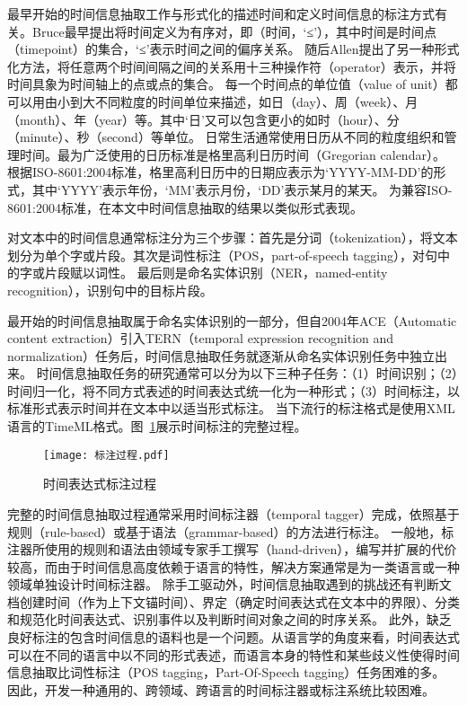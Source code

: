 最早开始的时间信息抽取工作与形式化的描述时间和定义时间信息的标注方式有关。Bruce\cite{bruce1972model}最早提出将时间定义为有序对，即（时间，‘≤’），其中时间是时间点（timepoint）的集合，‘≤’表示时间之间的偏序关系。
随后Allen\cite{allen1983maintaining}提出了另一种形式化方法，将任意两个时间间隔之间的关系用十三种操作符（operator）表示，并将时间具象为时间轴上的点或点的集合。
每一个时间点的单位值（value of unit）都可以用由小到大不同粒度的时间单位来描述，如日（day）、周（week）、月（month）、年（year）等。其中‘日’又可以包含更小的如时（hour）、分（minute）、秒（second）等单位。
日常生活通常使用日历从不同的粒度组织和管理时间。最为广泛使用的日历标准是格里高利日历时间（Gregorian calendar）。
根据ISO-8601:2004标准，格里高利日历中的日期应表示为‘YYYY-MM-DD’的形式，其中‘YYYY’表示年份，‘MM’表示月份，‘DD’表示某月的某天。
为兼容ISO-8601:2004标准，在本文中时间信息抽取的结果以类似形式表现。

对文本中的时间信息通常标注分为三个步骤：首先是分词（tokenization），将文本划分为单个字或片段。其次是词性标注（POS，part-of-speech tagging），对句中的字或片段赋以词性。
最后则是命名实体识别（NER，named-entity recognition），识别句中的目标片段。

最开始的时间信息抽取属于命名实体识别的一部分，但自2004年ACE\cite{doddington2004automatic}（Automatic content extraction）引入TERN（temporal expression recognition and normalization）任务后，时间信息抽取任务就逐渐从命名实体识别任务中独立出来。
时间信息抽取任务的研究通常可以分为以下三种子任务：（1）时间识别；（2）时间归一化，将不同方式表述的时间表达式统一化为一种形式；（3）时间标注，以标准形式表示时间并在文本中以适当形式标注。
当下流行的标注格式是使用XML语言的TimeML\cite{pustejovsky2003timeml}格式。图~\ref{fig:tagging_pregress}展示时间标注的完整过程。

\begin{figure}[h]
    \centering
    \texttt{[image: 标注过程.pdf]}
    \caption{时间表达式标注过程}
    \label{fig:tagging_pregress}
\end{figure}

完整的时间信息抽取过程通常采用时间标注器（temporal tagger）完成，依照基于规则（rule-based）或基于语法（grammar-based）的方法进行标注。
一般地，标注器所使用的规则和语法由领域专家手工撰写（hand-driven），编写并扩展的代价较高，而由于时间信息高度依赖于语言的特性，解决方案通常是为一类语言或一种领域单独设计时间标注器。
除手工驱动外，时间信息抽取遇到的挑战还有判断文档创建时间（作为上下文锚时间）、界定（确定时间表达式在文本中的界限）、分类和规范化时间表达式、识别事件以及判断时间对象之间的时序关系。
此外，缺乏良好标注的包含时间信息的语料也是一个问题。从语言学的角度来看，时间表达式可以在不同的语言中以不同的形式表述，而语言本身的特性和某些歧义性使得时间信息抽取比词性标注（POS tagging，Part-Of-Speech tagging）任务困难的多。
因此，开发一种通用的、跨领域、跨语言的时间标注器或标注系统比较困难。

